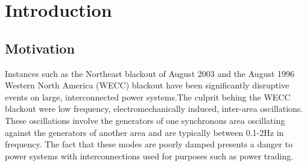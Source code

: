 \documentclass[conference]{IEEEtran}
\begin{document}
%
\IEEEpeerreviewmaketitle

\section{Introduction}
\subsection{Motivation}
Instances such as the Northeast blackout of August 2003 and the August 1996 Western North America (WECC)\cite{NAERC} blackout have been significantly disruptive events on large, interconnected power systems.The culprit behing the WECC blackout were low frequency, electromechanically induced, inter-area oscillations\cite{NAERC}. These oscillations involve the generators of one synchronous area oscillating against the generators of another area and are typically between 0.1-2Hz in frequency. The fact that these modes are poorly damped\cite{WAPODNorway} presents a danger to power systems with interconnections used for purposes such as power trading.
\end{document}

